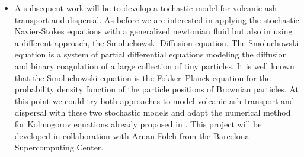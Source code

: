 \documentclass{article}
\numberwithin{equation}{section}
\begin{document}
\begin{itemize}
\item A subsequent work will be to develop a tochastic model for volcanic ash transport and dispersal. As before we are interested in applying the stochastic Navier-Stokes equations with a generalized newtonian fluid but also in using a different approach, the Smoluchowski Diffusion equation. The Smoluchowski equation is a system of partial differential equations modeling the diffusion and binary coagulation of a large collection of tiny particles. It is well known that the 
Smoluchowski equation is the Fokker–Planck equation for the probability density function of the particle positions of 
Brownian particles. At this point we could try both approaches to model volcanic ash transport and dispersal with these two stochastic models and 
adapt the numerical method for Kolmogorov equations already proposed in \cite{de-fl}. This project will be developed in collaboration
with Arnau Folch from the Barcelona Supercomputing Center.

\end{itemize}
\end{document}

